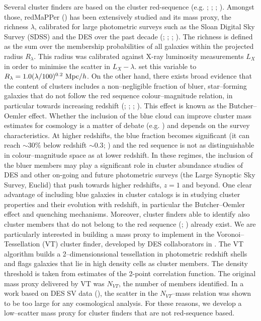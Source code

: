 Several cluster finders are based on the cluster red-sequence (e.g. \citealt{koester}; \citealt{hao}; \citealt{oguri}; \citealt{redpaper}). Amongst those, redMaPPer (\citealt{redpaper}) has been extensively studied and its mass proxy, the richness $\lambda$, calibrated for large photometric surveys such as the Sloan Digital Sky Survey (SDSS) and the DES over the past decade (\citealt{rozo09}; \citealt{lambda}; \citealt{extrinsicscatter}; \citealt{redmappersv}).  The richness is defined as the sum over the membership probabilities of all galaxies within the projected radius $R_\lambda$. This radius was calibrated against X-ray luminosity measurements $L_X$ in order to minimise the scatter in $L_X-\lambda$. \citet{2012ApJ...746..178R} set this variable to $R_\lambda = 1.0(\lambda/100)^{0.2} ~{\rm Mpc}/h$. On the other hand, there exists broad evidence that the content of clusters includes a non--negligible fraction of bluer, star--forming galaxies that do not follow the red sequence colour--magnitude relation, in particular towards increasing redshift (\citealt{oemler}; \citealt{butcher1}; \citealt{butcher2}; \citealt{Donahue}). This effect is known as the Butcher--Oemler effect.
Whether the inclusion of the blue cloud can improve cluster mass estimates for cosmology is a matter of debate (e.g. \citealt{extrinsicscatter}) and depends on the survey characteristics. At higher redshifts, the blue fraction becomes significant (it can reach $\sim 30\%$ below redshift $\sim 0.3$; \citealt{zu2}) and the red sequence is not as distinguishable in colour--magnitude space as at lower redshift. In these regimes, the inclusion of the bluer members may play a significant role in cluster abundance studies of DES and other on-going and future photometric surveys (the Large Synoptic Sky Survey, Euclid) that push towards higher redshifts, $z=1$ and beyond. One clear advantage of including blue galaxies in cluster catalogs is in studying cluster properties and their evolution with redshift, in particular the Butcher--Oemler effect and quenching mechanisms. Moreover, cluster finders able to identify also cluster members that do not belong to the red sequence (\citealt{miller05}; \citealt{vt}) already exist. We are particularly interested in building a mass proxy to implement in the Voronoi--Tessellation (VT) cluster finder, developed by DES collaborators in \citet{vt}. The VT algorithm builds a 2--dimensionsional tessellation in photometric redshift shells and flags galaxies that lie in high density cells as cluster members. The density threshold is taken from estimates of the 2-point correlation function. The original mass proxy delivered by VT was $N_{VT}$, the number of members identified. In a work based on DES SV data (\citealt{2015MNRAS.454.2305S}), the scatter in the $N_{VT}$--mass relation was shown to be too large for any cosmological analysis. For these reasons, we develop a low--scatter mass proxy for cluster finders that are not red-sequence based.

